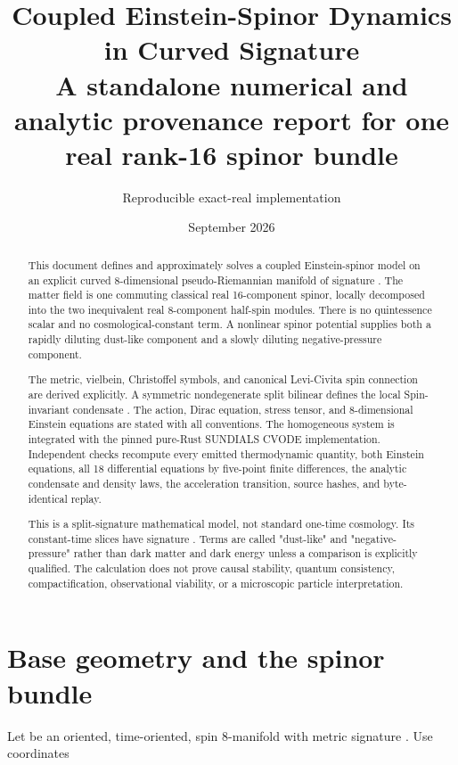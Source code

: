 \documentclass[11pt]{article}
\title{Coupled Einstein-Spinor Dynamics in Curved Signature \texttt{\detokenize{(4,4)}}\\[0.5em]\large A standalone numerical and analytic provenance report for one real rank-16 spinor bundle}
\author{Reproducible exact-real implementation}
\date{September 2026}
\begin{document}
\maketitle
\tableofcontents
\newpage
\begin{abstract}
This document defines and approximately solves a coupled Einstein-spinor model on an explicit curved 8-dimensional pseudo-Riemannian manifold of signature \texttt{}. The matter field is one commuting classical real 16-component \texttt{} spinor, locally decomposed into the two inequivalent real 8-component half-spin modules. There is no quintessence scalar and no cosmological-constant term. A nonlinear spinor potential supplies both a rapidly diluting dust-like component and a slowly diluting negative-pressure component.

The metric, vielbein, Christoffel symbols, and canonical Levi-Civita spin connection are derived explicitly. A symmetric nondegenerate split bilinear \texttt{} defines the local Spin-invariant condensate \texttt{}. The action, Dirac equation, stress tensor, and 8-dimensional Einstein equations are stated with all conventions. The homogeneous system is integrated with the pinned pure-Rust SUNDIALS CVODE implementation. Independent checks recompute every emitted thermodynamic quantity, both Einstein equations, all 18 differential equations by five-point finite differences, the analytic condensate and density laws, the acceleration transition, source hashes, and byte-identical replay.

This is a split-signature mathematical model, not standard one-time cosmology. Its constant-time slices have signature \texttt{}. Terms are called "dust-like" and "negative-pressure" rather than dark matter and dark energy unless a comparison is explicitly qualified. The calculation does not prove causal stability, quantum consistency, compactification, observational viability, or a microscopic particle interpretation.

\end{abstract}

\section{Base geometry and the spinor bundle}

Let \texttt{} be an oriented, time-oriented, spin 8-manifold with metric signature \texttt{}. Use coordinates
\end{document}
